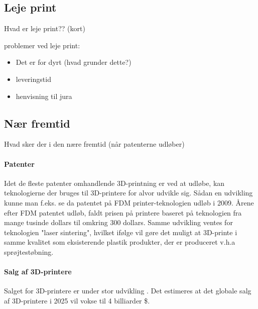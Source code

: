 \subsection{Leje print} %
\label{sub:leje_print}

Hvad er leje print?? (kort)


problemer ved leje print:

\begin{itemize}
	\item Det er for dyrt (hvad grunder dette?)
	\item leveringstid
	\item henvisning til jura
\end{itemize}


\subsection{Nær fremtid} %
\label{sub:f_lles_problemer}

Hvad sker der i den nære fremtid (når patenterne udløber)



\paragraph{Patenter} %

Idet de fleste patenter omhandlende 3D-printning er ved at udløbe, kan teknologierne der bruges til 3D-printere for alvor udvikle sig. Sådan en udvikling kunne man f.eks. se da patentet på FDM printer-teknologien udløb i 2009. \autocite{manyika_disruptive_2013} Årene efter FDM patentet udløb, faldt prisen på printere baseret på teknologien fra mange tusinde dollars til omkring 300 dollars. \autocite{mims_3d_2013} Samme udvikling ventes for teknologien "laser sintering", hvilket ifølge \autocite{mims_3d_2013} vil gøre det muligt at 3D-printe i samme kvalitet som eksisterende plastik produkter, der er produceret v.h.a sprøjtestøbning.





\paragraph{Salg af 3D-printere}

Salget for 3D-printere er under stor udvikling \autocite{wohler_sales_2012}. Det estimeres at det globale salg af 3D-printere i 2025 vil vokse til 4 billiarder \$. \autocite[110]{manyika_disruptive_2013}





